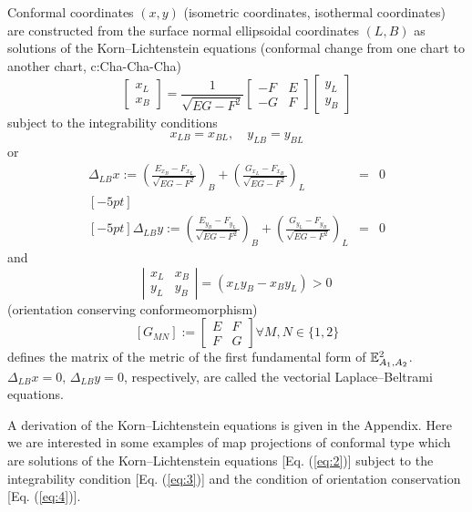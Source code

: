\documentclass[jog]{svjour}
\begin{document}
Conformal coordinates $(x,y)$ (isometric coordinates, isothermal
coordinates) are constructed from the surface normal ellipsoidal
coordinates $(L,B)$ as solutions of the Korn--Lichtenstein equations
(conformal change from one chart to another chart, c:Cha-Cha-Cha)
\begin{equation}
\left[\begin{array}{c}
 x_L\\
 x_B
 \end{array}
\right] = \frac{1}{\sqrt{EG-F^2}}
\left[\begin{array}{cc}
 -F&E\\
 -G&F
 \end{array}
\right]
\left[\begin{array}{c}
 y_L\\
 y_B
 \end{array}
\right]
\label{eq:2}
\end{equation}
subject to the integrability conditions
\begin{displaymath}
x_{LB}=x_{BL},\quad y_{LB}=y_{BL}
\end{displaymath}
or
\begin{eqnarray}
\Delta_{LB}x := \left(\frac{E_{x_B}-F_{x_L}}{\sqrt{EG-F^2}}\right)_B
+ \left(\frac{G_{x_L}-F_{x_B}}{\sqrt{EG-F^2}}\right)_L &= &0 \nonumber \\
[-5pt] & &\\ [-5pt]
\Delta_{LB}y := \left(\frac{E_{y_B}-F_{y_L}}{\sqrt{EG-F^2}}\right)_B
+ \left(\frac{G_{y_L}-F_{y_B}}{\sqrt{EG-F^2}}\right)_L &= &0 \nonumber
\label{eq:3}
\end{eqnarray}
and
\begin{equation}
\left|\begin{array}{cc}
 x_L&x_B\\
 y_L&y_B
 \end{array}
\right|=(x_Ly_B-x_By_L)>0
\label{eq:4}
\end{equation}
(orientation conserving conformeomorphism)
\begin{displaymath}
\left[G_{MN}\right]:=\left[\begin{array}{cc}
 E&F\\
 F&G\end{array}
 \right]
\forall M,N \in \{1,2\}
\end{displaymath}
defines the matrix of the metric of the first fundamental form of
$\Bbb{E}^2_{A_1,A_2}$. $\Delta_{LB}x=0,\,\Delta_{LB}y=0$, respectively,
are called the vectorial Laplace--Beltrami equations.

A derivation of the Korn--Lichtenstein equations is given in the
Appendix. Here we are interested in some examples of map projections of
conformal type which are solutions of the Korn--Lichtenstein equations
[Eq. (\ref{eq:2})] subject to the integrability condition [Eq.
(\ref{eq:3})] and the condition of orientation conservation [Eq.
(\ref{eq:4})].
\end{document}
